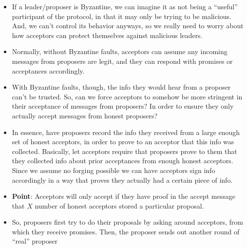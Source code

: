 \documentclass[10pt,a4paper]{article}
\begin{document}
\begin{itemize}
    \item If a leader/proposer is Byzantine, we can imagine it as not being a ``useful'' participant of the protocol, in that it may only be trying to be malicious. And, we can't control its behavior anyways, so we really need to worry about how acceptors can protect themselves against malicious leaders. 
    \item Normally, without Byzantine faults, acceptors can assume any incoming messages from proposers are legit, and they can respond with promises or acceptances accordingly.
    \item With Byzantine faults, though, the info they would hear from a proposer can't be trusted. So, can we force acceptors to somehow be more stringent in their acceptance of messages from proposers? In order to ensure they only actually accept messages from honest proposers?
    \item In essence, have proposers record the info they received from a large enough set of honest acceptors, in order to prove to an acceptor that this info was collected. Basically, let acceptors require that proposers prove to them that they collected info about prior acceptances from enough honest acceptors. Since we assume no forging possible we can have acceptors sign info accordingly in a way that proves they actually had a certain piece of info.
    \item \textbf{Point}: Acceptors will only accept if they have proof in the accept message that $X$ number of honest acceptors stored a particular proposal. 
    \item So, proposers first try to do their proposals by asking around acceptors, from which they receive promises. Then, the proposer sends out another round of ``real'' proposer
\end{itemize}




\end{document}

